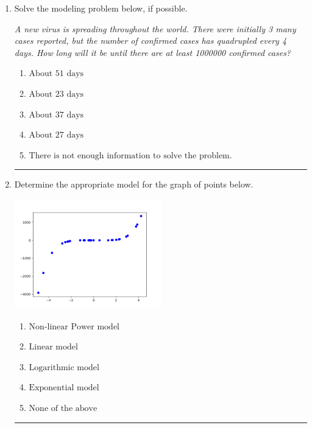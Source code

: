 \documentclass[14pt]{extbook}
\newcommand{\litem}[1]{\item#1\hspace*{-1cm}\rule{\textwidth}{0.4pt}}
\begin{document}
\begin{enumerate}
{\begin{enumerate}[label=\Alph*.]
\end{enumerate} }
\litem{
Solve the modeling problem below, if possible.
\begin{center}
    \textit{ A new virus is spreading throughout the world. There were initially 3 many cases reported, but the number of confirmed cases has quadrupled every 4 days. How long will it be until there are at least 1000000 confirmed cases? }
\end{center}
\begin{enumerate}[label=\Alph*.]
\item \( \text{About } 51 \text{ days} \)
\item \( \text{About } 23 \text{ days} \)
\item \( \text{About } 37 \text{ days} \)
\item \( \text{About } 27 \text{ days} \)
\item \( \text{There is not enough information to solve the problem.} \)

\end{enumerate} }
\litem{
Determine the appropriate model for the graph of points below.
\begin{center}
    \includegraphics[width=0.5\textwidth]{../Figures/identifyModelGraph12CopyA.png}
\end{center}
\begin{enumerate}[label=\Alph*.]
\item \( \text{Non-linear Power model} \)
\item \( \text{Linear model} \)
\item \( \text{Logarithmic model} \)
\item \( \text{Exponential model} \)
\item \( \text{None of the above} \)


\end{enumerate}}
\end{enumerate}
\end{document}
